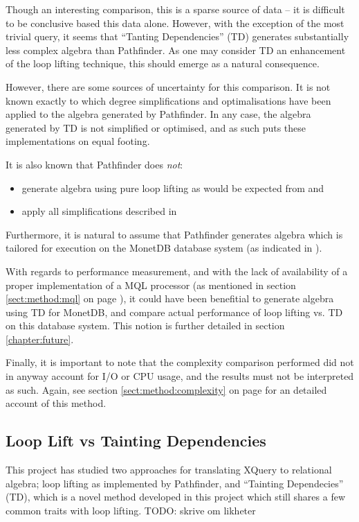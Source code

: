 Though an interesting comparison, this is a sparse source of data -- it
is difficult to be conclusive based this data alone. However, with the
exception of the most trivial query, it seems that ``Tanting Dependencies'' (TD)
generates substantially less complex algebra than Pathfinder. As one
may consider TD an enhancement of the loop lifting technique, this should
emerge as a natural consequence.

However, there are some sources of uncertainty for this comparison. It is not
known exactly to which degree simplifications and optimalisations have been
applied to the algebra generated by Pathfinder. In any case, the
algebra generated by TD is not simplified or optimised, and as such puts these
implementations on equal footing. 

It is also known that Pathfinder does \emph{not}:
\begin{itemize}
  \item generate algebra using pure loop lifting as would be expected from
  \cite{pathfinder_mothertongue} and \cite{pathfinder_purelyRelational}
  \item apply all simplifications described in
  \cite{pathfinder_purelyRelational}
\end{itemize}

Furthermore, it is natural to assume that Pathfinder generates algebra
which is tailored for execution on the MonetDB database system (as indicated
in \cite{pathfinder_purelyRelational}).

With regards to performance measurement, and with the lack of availability of a
proper implementation of a MQL processor (as mentioned in section
\ref{sect:method:mql} on page \pageref{sect:method:mql}), it could have been
benefitial to generate algebra using TD for MonetDB, and compare
actual performance of loop lifting vs. TD on this database system. This notion
is further detailed in section \ref{chapter:future}.

Finally, it is important to note that the complexity comparison performed did
not in anyway account for I/O or CPU usage, and the results must not be
interpreted as such. Again, see section \ref{sect:method:complexity} on
page \pageref{sect:method:complexity} for an detailed account of this method.

\subsection{Loop Lift vs Tainting Dependencies}
\label{sect:disc:llvsTD}
This project has studied two approaches for translating XQuery to relational
algebra; loop lifting as implemented by Pathfinder, and ``Tainting
Dependecies'' (TD), which is a novel method developed in this project which
still shares a few common traits with loop lifting. TODO: skrive om likheter

